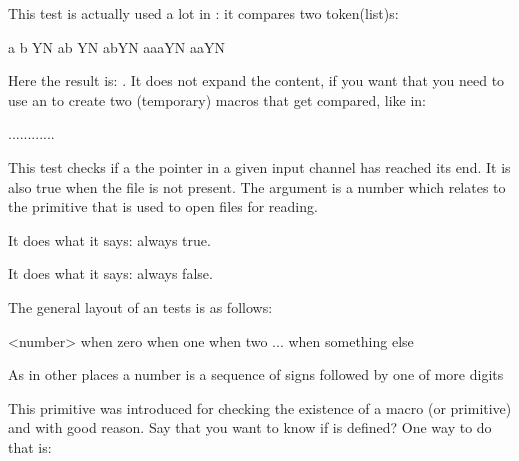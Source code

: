 This test is actually used a lot in \CONTEXT: it compares two token(list)s:

\startbuffer
                   \ifx a b  Y\else N\fi
                   \ifx ab   Y\else N\fi
\def\A {a}\def\B{b}\ifx \A\B Y\else N\fi
\def\A{aa}\def\B{a}\ifx \A\B Y\else N\fi
\def\A {a}\def\B{a}\ifx \A\B Y\else N\fi
\stopbuffer

\typebuffer[option=TEX]

Here the result is: \quotation{\inlinebuffer}. It does not expand the content, if
you want that you need to use an \type {\edef} to create two (temporary) macros
that get compared, like in:

\starttyping[option=TEX]
\edef{}\edef{}\ifx\TempA\TempB ...\else ...\fi
\stoptyping

\stopsectionlevel

\startsectionlevel[title={\tex{ifeof}}]

This test checks if a the pointer in a given input channel has reached its end.
It is also true when the file is not present. The argument is a number which
relates to the \type {\openin} primitive that is used to open files for reading.

\stopsectionlevel

\startsectionlevel[title={\tex{iftrue}}]

It does what it says: always true.

\stopsectionlevel

\startsectionlevel[title={\tex{iffalse}}]

It does what it says: always false.

\stopsectionlevel

\startsectionlevel[title={\tex{ifcase}}]

The general layout of an \type {\ifcase} tests is as follows:

\starttyping[option=TEX]
\ifcase<number>
    when zero
\or
    when one
\or
    when two
\or
    ...
\else
    when something else
\fi
\stoptyping

As in other places a number is a sequence of signs followed by one of more digits

\stopsectionlevel

\stopsectionlevel

\startsectionlevel[title={\ETEX\ primitives}]

\startsectionlevel[title={\tex{ifdefined}}]

This primitive was introduced for checking the existence of a macro (or primitive)
and with good reason. Say that you want to know if \type {\MyMacro} is defined? One
way to do that is:

